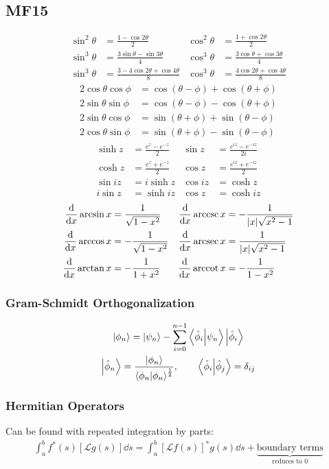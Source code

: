 \documentclass[8pt]{extarticle}
\newcommand{\Lh}{ {\mathcal{L}} }
\begin{document}
\begin{multicols*}{3}
\subsection{MF15}
\begin{align*}
    \sin^2\theta &= \frac{1-\cos2\theta}{2} & \cos^2\theta &=
    \frac{1+\cos2\theta}{2} \\
    \sin^3\theta &= \frac{3\sin\theta - \sin3\theta}{4} & \cos^3\theta &=
    \frac{3\cos\theta+\cos3\theta}{4} \\
    \sin^3\theta &= \frac{3-4\cos2\theta+\cos4\theta}{8} & \cos^3\theta &=
    \frac{4\cos2\theta+\cos4\theta}{8}
\end{align*}
\begin{align*}
    2\cos\theta\cos\phi &= \cos(\theta-\phi)+\cos(\theta+\phi)\\
    2\sin\theta\sin\phi &= \cos(\theta-\phi)-\cos(\theta+\phi)\\
    2\sin\theta\cos\phi &= \sin(\theta+\phi)+\sin(\theta-\phi)\\
    2\cos\theta\sin\phi &= \sin(\theta+\phi)-\sin(\theta-\phi)
\end{align*}
\begin{align*}
    \sinh z &= \frac{e^z-e^{-z}}{2} & \sin z &= \frac{e^{iz}-e^{-iz}}{2i} \\
    \cosh z &= \frac{e^z+e^{-z}}{2} & \cos z &= \frac{e^{iz}+e^{-iz}}{2} \\
    \sin iz &= i\sinh z & \cos iz &= \cosh z \\
    i\sin z &= \sinh iz & \cos z &= \cosh iz
\end{align*}
\begin{align*}
    \dv{}{x} \arcsin x &= \frac{1}{\sqrt{1-x^2}}
                       & \dv{}{x} \arccsc x &= -\frac{1}{|x|\sqrt{x^2-1}} \\
    \dv{}{x} \arccos x &= -\frac{1}{\sqrt{1-x^2}}
                       & \dv{}{x} \arcsec x &= \frac{1}{|x|\sqrt{x^2-1}} \\
    \dv{}{x} \arctan x &= -\frac{1}{1+x^2}
                       & \dv{}{x} \arccot x &= -\frac{1}{1-x^2}
\end{align*}


\subsubsection{Gram-Schmidt Orthogonalization}
\begin{gather*}
    \ket{\phi_n} = \ket{\psi_n} - \sum_{i=0}^{n-1} \braket{\hat{\phi}_i}{\psi_n}
    \ket{\hat{\phi}_i} \\
    \ket{\hat{\phi}_n} =
    \frac{\ket{\phi_n}}{\braket{\phi_n}{\phi_n}^{\frac{1}{2}}}, \qquad
    \braket{\hat{\phi}_i}{\hat{\phi}_j} = \delta_{ij}
\end{gather*}

\subsubsection{Hermitian Operators}
Can be found with repeated integration by parts:
\begin{align*}
    \int_a^b f^*(s)[\Lh g(s)] \dd{s} = \int_a^b [\Lh f(s)]^* g(s) \dd{s} +
    \underbrace{\text{boundary terms}}_{\text{reduces to 0}}
\end{align*}

\end{multicols*}
\end{document}
